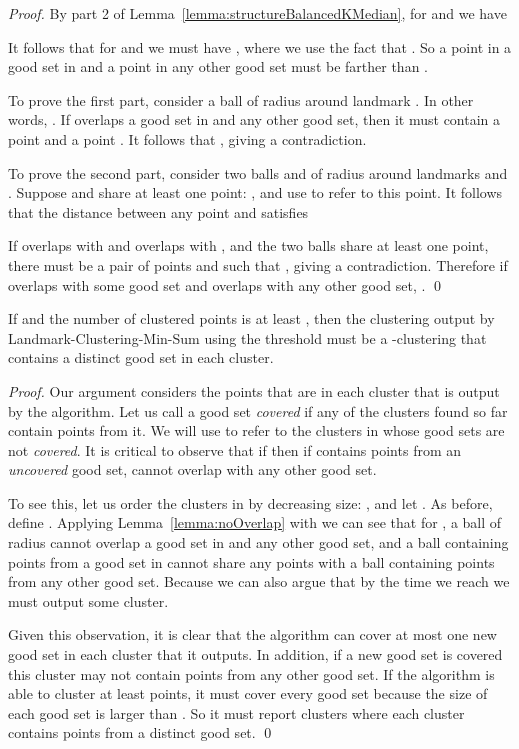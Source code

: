 \documentclass{llncs} \usepackage{algorithm}
\begin{document}
\begin{proof}

By part 2 of Lemma~\ref{lemma:structureBalancedKMedian}, for  and  we have



It follows that for  and  we must have , where we use the fact that .  So a point in a good set in  and a point in any other good set must be farther than .

To prove the first part, consider a ball  of radius  around landmark .  In other words, .  If  overlaps a good set in  and any other good set, then it must contain a point  and a point .  It follows that , giving a contradiction.

To prove the second part, consider two balls  and  of
radius  around landmarks  and .  Suppose  and  share at least one
point: , and use  to refer to
this point. It follows that the distance between any
point  and  satisfies 

If  overlaps with  and  overlaps with , and the two balls share at least one point, there must be a pair of points  and  such that , giving a contradiction.  Therefore if
 overlaps with some good set  and  overlaps with any other good set, . \qed


\end{proof}

\begin{lemma}\label{lemma:correctEstimate}
If  and the number of clustered points is at least , then the clustering output by Landmark-Clustering-Min-Sum using the threshold  must be a -clustering that contains a distinct good set in each cluster.

\end{lemma}

\begin{proof}
Our argument considers the points that are in each cluster that is output by the algorithm.  Let us call a good set \emph{covered} if any of the clusters  found so far contain points from it.  We will use  to refer to the clusters in  whose good sets are not \emph{covered}. It is critical to observe that if  then if  contains points from an \emph{uncovered} good set,  cannot overlap with any other good set.

To see this, let us order the clusters in  by decreasing size: , and let .  As before, define . Applying Lemma~\ref{lemma:noOverlap} with  we can see that for , a ball of radius  cannot overlap a good set in  and any other good set, and a ball containing points from a good set in  cannot share any points with a ball containing points from any other good set.  Because  we can also argue that by the time we reach  we must output some cluster.

Given this observation, it is clear that the algorithm can cover at most one new good set in each cluster that it outputs.  In addition, if a new good set is covered this cluster may not contain points from any other good set. If the algorithm is able to cluster at least  points, it must cover every good set because the size of each good set is larger than .  So it must report  clusters where each cluster contains points from a distinct good set. \qed

\end{proof}
\end{document}
